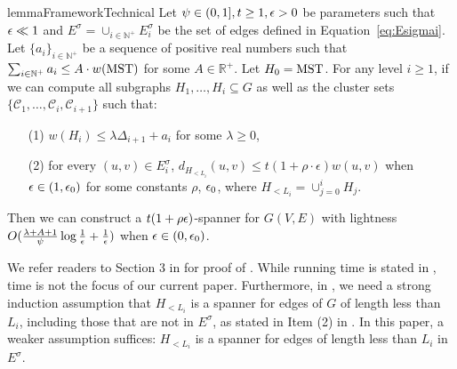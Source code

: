 \begin{restatable}{lemma}{FrameworkTechnical}
	\label{lm:framework-technical} Let $\psi \in (0,1], t \geq 1, \epsilon > 0$ be  parameters such that $\epsilon \ll 1$   and $E^{\sigma}= \cup_{i\in \mathbb{N}^+} E^{\sigma}_i$ be the set of edges defined in Equation~\eqref{eq:Esigmai}. Let $\{a_i\}_{i \in \mathbb{N}^+}$ be a sequence of positive real numbers such that $\sum_{i \in \mathbb{N}^+} a_i \leq A\cdot w(\mathrm{MST})$ for some $A\in \mathbb{R}^+$. Let $H_0 = \mathrm{MST}$. For any level $i\geq 1$, if we can compute all subgraphs  $H_1,\ldots,H_i\subseteq G$  as well as the cluster sets $\{\mathcal{C}_{1},\ldots,\mathcal{C}_{i},\mathcal{C}_{i+1}\}$ such that:
	\begin{enumerate}[noitemsep]
		\item[(1)] $w(H_i) \leq  \lambda \Delta_{i+1} + a_i$ for some $\lambda \geq 0$,
		\item[(2)] for every $(u,v)\in E^{\sigma}_i$, $d_{H_{<L_i}}(u,v)\leq t(1+ \rho\cdot \epsilon)w(u,v)$ when $\epsilon \in (1,\epsilon_0)$ for some constants $\rho$, $\epsilon_0$, where $H_{<L_i} = \cup_{j=0}^{i} H_{j}$.
	\end{enumerate}
	Then  we  can construct a $t(1+ \rho \epsilon)$-spanner  for $G(V,E)$ with lightness  $O(\frac{\lambda + A + 1}{\psi}\log \frac{1}{\epsilon} + \frac{1}{\epsilon})$ when $\epsilon \in (0,\epsilon_0)$.
\end{restatable}

We refer readers to Section 3 in \cite{LS21} for proof of . While running time is stated in  , time is not the focus of our current paper. Furthermore, in  \cite{LS21}, we need a strong induction assumption that $H_{<L_i}$ is a spanner for edges of $G$ of length less than $L_i$, including those that are not in $E^{\sigma}$, as stated in Item (2) in . In this paper, a weaker assumption suffices: $H_{<L_i}$ is a spanner for edges of length less than $L_i$ in $E^{\sigma}$.




